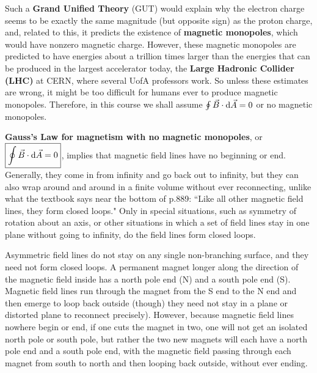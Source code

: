 Such a \textbf{Grand Unified Theory} (GUT) would explain why the electron charge seems to be exactly the same magnitude (but opposite sign) as the proton charge, and, related to this, it predicts the existence of \textbf{magnetic monopoles}, which would have nonzero magnetic charge. However, these magnetic monopoles are predicted to have energies about a trillion times larger than the energies that can be produced in the largest accelerator today, the \textbf{Large Hadronic Collider (LHC)} at CERN, where several UofA professors work. So unless these estimates are wrong, it might be too difficult for humans ever to produce magnetic monopoles. Therefore, in this course we shall assume $\oint \vec{B} \cdot \operatorname{d\!} \vec{A} = 0$ or no magnetic monopoles.

\textbf{Gauss's Law for magnetism with no magnetic monopoles}, or $\boxed{\oint \vec{B} \cdot \operatorname{d\!} \vec{A} = 0}$, implies that magnetic field lines have no beginning or end. Generally, they come in from infinity and go back out to infinity, but they can also wrap around and around in a finite volume without ever reconnecting, unlike what the textbook says near the bottom of p.889: ``Like all other magnetic field lines, they form closed loops." Only in special situations, such as symmetry of rotation about an axis, or other situations in which a set of field lines stay in one plane without going to infinity, do the field lines form closed loops.

Asymmetric field lines do not stay on any single non-branching surface, and they need not form closed loops. A permanent magnet longer along the direction of the magnetic field inside has a north pole end (N) and a south pole end (S). Magnetic field lines run through the magnet from the S end to the N end and then emerge to loop back outside (though) they need not stay in a plane or distorted plane to reconnect precisely). However, because magnetic field lines nowhere begin or end, if one cuts the magnet in two, one will not get an isolated north pole or south pole, but rather the two new magnets will each have a north pole end and a south pole end, with the magnetic field passing through each magnet from south to north and then looping back outside, without ever ending.

